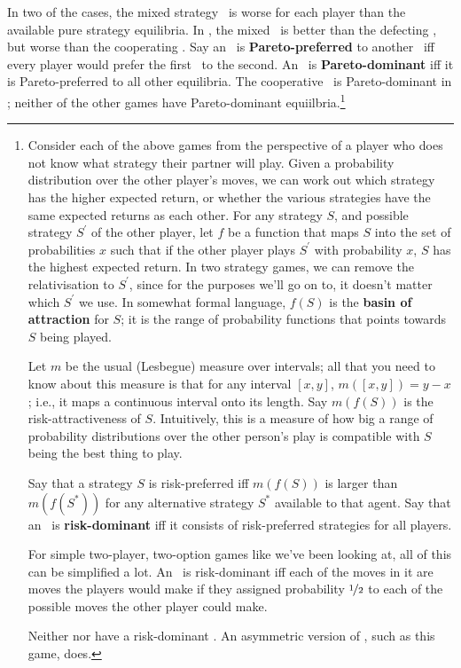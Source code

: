 In two of the cases, the mixed strategy \eqm\ is worse for each player than the available pure strategy equilibria. In , the mixed \eqm\ is better than the defecting \eqm, but worse than the cooperating \eqm. Say an \eqm\ is \textbf{Pareto-preferred} to another \eqm\ iff every player would prefer the first \eqm\ to the second. An \eqm\ is \textbf{Pareto-dominant} iff it is Pareto-preferred to all other equilibria. The cooperative \eqm\ is Pareto-dominant in ; neither of the other games have Pareto-dominant equiilbria.\footnote{Consider each of the above games from the perspective of a player who does not know what strategy their partner will play. Given a probability distribution over the other player's moves, we can work out which strategy has the higher expected return, or whether the various strategies have the same expected returns as each other. For any strategy $S$, and possible strategy $S^\prime$ of the other player,  let $f$ be a function that maps $S$ into the set of probabilities $x$ such that if the other player plays $S^\prime$ with probability $x$, $S$ has the highest expected return. In two strategy games, we can remove the relativisation to $S^\prime$, since for the purposes we'll go on to, it doesn't matter which $S^\prime$ we use. In somewhat formal language, $f(S)$ is the \textbf{basin of attraction} for $S$; it is the range of probability functions that points towards $S$ being played.

Let $m$ be the usual (Lesbegue) measure over intervals; all that you need to know about this measure is that for any interval $[x, y]$, $m([x, y]) = y - x$; i.e., it maps a continuous interval onto its length. Say $m(f(S))$ is the risk-attractiveness of $S$. Intuitively, this is a measure of how big a range of probability distributions over the other person's play is compatible with $S$ being the best thing to play.

Say that a strategy $S$ is risk-preferred iff $m(f(S))$ is larger than $m(f(S^*))$ for any alternative strategy $S^*$ available to that agent. Say that an \eqm\ is \textbf{risk-dominant} iff it consists of risk-preferred strategies for all players.

For simple two-player, two-option games like we've been looking at, all of this can be simplified a lot. An \eqm\ is risk-dominant iff each of the moves in it are moves the players would make if they assigned probability $\nicefrac{1}{2}$ to each of the possible moves the other player could make.

Neither  nor  have a risk-dominant \eqm. An asymmetric version of , such as this game, does.

}
